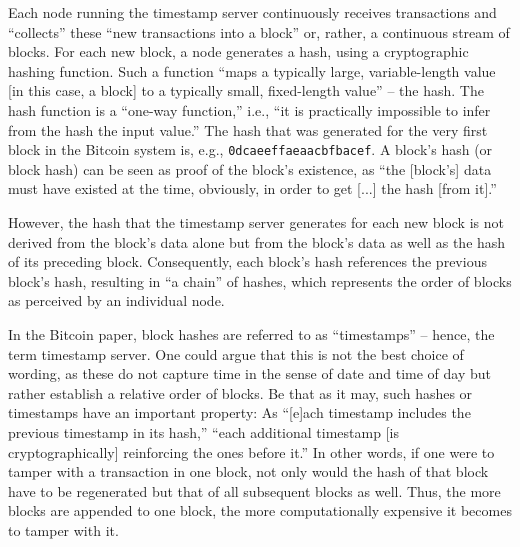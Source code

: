 Each node running the timestamp server continuously receives transactions and ``collects'' these ``new transactions into a block'' or, rather, a continuous stream of blocks. \autocite[3]{bitcoin2008paper}
For each new block, a node generates a hash, using a cryptographic hashing function.
Such a function ``maps a typically large, variable-length value [in this case, a block] to a typically small, fixed-length value'' -- the hash. \autocite[6]{github2020blockchaintokens}
The hash function is a ``one-way function,'' i.e., ``it is practically impossible to infer from the hash the input value.'' \autocite[6]{github2020blockchaintokens}
The hash that was generated for the very first block in the Bitcoin system is, e.g., \texttt{0\allowbreak  d\allowbreak  c\allowbreak  a\allowbreak  e\allowbreak  e\allowbreak  f\allowbreak  f\allowbreak  a\allowbreak  e\allowbreak  a\allowbreak  a\allowbreak  c\allowbreak  b\allowbreak  f\allowbreak  b\allowbreak  a\allowbreak  c\allowbreak  e\allowbreak  f}. \autocite{blockchaincom2020block0}
A block's hash (or block hash) can be seen as proof of the block's existence, as ``the [block's] data must have existed at the time, obviously, in order to get [...] the hash [from it].'' \autocite[2]{bitcoin2008paper}

However, the hash that the timestamp server generates for each new block is not derived from the block's data alone but from the block's data as well as the hash of its preceding block.
Consequently, each block's hash references the previous block's hash, resulting in ``a chain'' \autocite[2]{bitcoin2008paper} of hashes, which represents the order of blocks as perceived by an individual node.

In the Bitcoin paper, block hashes are referred to as ``timestamps'' \autocite{bitcoin2008paper} -- hence, the term timestamp server.
One could argue that this is not the best choice of wording, as these do not capture time in the sense of date and time of day but rather establish a relative order of blocks.
Be that as it may, such hashes or timestamps have an important property:
As ``[e]ach timestamp includes the previous timestamp in its hash,'' ``each additional timestamp [is cryptographically] reinforcing the ones before it.'' \autocite[2]{bitcoin2008paper}
In other words, if one were to tamper with a transaction in one block, not only would the hash of that block have to be regenerated but that of all subsequent blocks as well.
Thus, the more blocks are appended to one block, the more computationally expensive it becomes to tamper with it.

